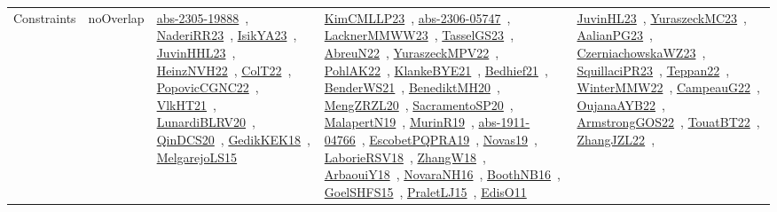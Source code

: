 {\begin{longtable}{lp{3cm}>{\raggedright\arraybackslash}p{6cm}>{\raggedright\arraybackslash}p{6cm}>{\raggedright\arraybackslash}p{8cm}}
Constraints & noOverlap & \href{articles/abs-2305-19888.pdf}{abs-2305-19888}~\cite{abs-2305-19888}, \href{articles/NaderiRR23.pdf}{NaderiRR23}~\cite{NaderiRR23}, \href{articles/IsikYA23.pdf}{IsikYA23}~\cite{IsikYA23}, \href{papers/JuvinHHL23.pdf}{JuvinHHL23}~\cite{JuvinHHL23}, \href{articles/HeinzNVH22.pdf}{HeinzNVH22}~\cite{HeinzNVH22}, \href{articles/ColT22.pdf}{ColT22}~\cite{ColT22}, \href{papers/PopovicCGNC22.pdf}{PopovicCGNC22}~\cite{PopovicCGNC22}, \href{articles/VlkHT21.pdf}{VlkHT21}~\cite{VlkHT21}, \href{articles/LunardiBLRV20.pdf}{LunardiBLRV20}~\cite{LunardiBLRV20}, \href{articles/QinDCS20.pdf}{QinDCS20}~\cite{QinDCS20}, \href{articles/GedikKEK18.pdf}{GedikKEK18}~\cite{GedikKEK18}, \href{papers/MelgarejoLS15.pdf}{MelgarejoLS15}~\cite{MelgarejoLS15} & \href{papers/KimCMLLP23.pdf}{KimCMLLP23}~\cite{KimCMLLP23}, \href{articles/abs-2306-05747.pdf}{abs-2306-05747}~\cite{abs-2306-05747}, \href{articles/LacknerMMWW23.pdf}{LacknerMMWW23}~\cite{LacknerMMWW23}, \href{papers/TasselGS23.pdf}{TasselGS23}~\cite{TasselGS23}, \href{articles/AbreuN22.pdf}{AbreuN22}~\cite{AbreuN22}, \href{articles/YuraszeckMPV22.pdf}{YuraszeckMPV22}~\cite{YuraszeckMPV22}, \href{articles/PohlAK22.pdf}{PohlAK22}~\cite{PohlAK22}, \href{papers/KlankeBYE21.pdf}{KlankeBYE21}~\cite{KlankeBYE21}, \href{articles/Bedhief21.pdf}{Bedhief21}~\cite{Bedhief21}, \href{papers/BenderWS21.pdf}{BenderWS21}~\cite{BenderWS21}, \href{articles/BenediktMH20.pdf}{BenediktMH20}~\cite{BenediktMH20}, \href{articles/MengZRZL20.pdf}{MengZRZL20}~\cite{MengZRZL20}, \href{articles/SacramentoSP20.pdf}{SacramentoSP20}~\cite{SacramentoSP20}, \href{papers/MalapertN19.pdf}{MalapertN19}~\cite{MalapertN19}, \href{papers/MurinR19.pdf}{MurinR19}~\cite{MurinR19}, \href{articles/abs-1911-04766.pdf}{abs-1911-04766}~\cite{abs-1911-04766}, \href{articles/EscobetPQPRA19.pdf}{EscobetPQPRA19}~\cite{EscobetPQPRA19}, \href{articles/Novas19.pdf}{Novas19}~\cite{Novas19}, \href{articles/LaborieRSV18.pdf}{LaborieRSV18}~\cite{LaborieRSV18}, \href{articles/ZhangW18.pdf}{ZhangW18}~\cite{ZhangW18}, \href{papers/ArbaouiY18.pdf}{ArbaouiY18}~\cite{ArbaouiY18}, \href{articles/NovaraNH16.pdf}{NovaraNH16}~\cite{NovaraNH16}, \href{papers/BoothNB16.pdf}{BoothNB16}~\cite{BoothNB16}, \href{articles/GoelSHFS15.pdf}{GoelSHFS15}~\cite{GoelSHFS15}, \href{papers/PraletLJ15.pdf}{PraletLJ15}~\cite{PraletLJ15}, \href{papers/EdisO11.pdf}{EdisO11}~\cite{EdisO11} & \href{papers/JuvinHL23.pdf}{JuvinHL23}~\cite{JuvinHL23}, \href{papers/YuraszeckMC23.pdf}{YuraszeckMC23}~\cite{YuraszeckMC23}, \href{papers/AalianPG23.pdf}{AalianPG23}~\cite{AalianPG23}, \href{articles/CzerniachowskaWZ23.pdf}{CzerniachowskaWZ23}~\cite{CzerniachowskaWZ23}, \href{papers/SquillaciPR23.pdf}{SquillaciPR23}~\cite{SquillaciPR23}, \href{papers/Teppan22.pdf}{Teppan22}~\cite{Teppan22}, \href{papers/WinterMMW22.pdf}{WinterMMW22}~\cite{WinterMMW22}, \href{articles/CampeauG22.pdf}{CampeauG22}~\cite{CampeauG22}, \href{papers/OujanaAYB22.pdf}{OujanaAYB22}~\cite{OujanaAYB22}, \href{papers/ArmstrongGOS22.pdf}{ArmstrongGOS22}~\cite{ArmstrongGOS22}, \href{papers/TouatBT22.pdf}{TouatBT22}~\cite{TouatBT22}, \href{papers/ZhangJZL22.pdf}{ZhangJZL22}~\cite{ZhangJZL22}, 
\end{longtable}}
